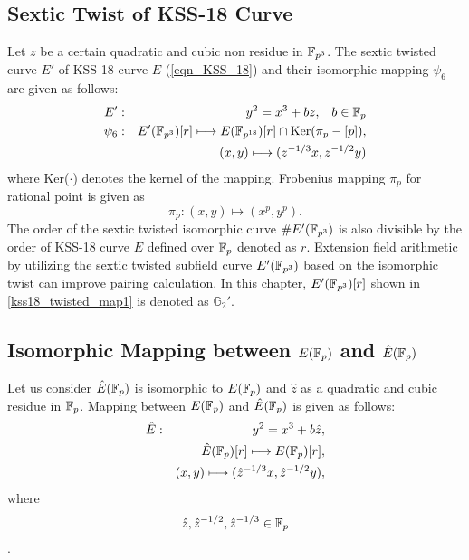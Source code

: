 \subsection{Sextic Twist of KSS-18 Curve }
\label{sec:ch:icisc:sextictwist_KSS18}
Let $z$ be a certain quadratic and cubic non residue in  $\mathbb{F}_{p^{3}}$. 
The sextic twisted curve $E'$ of KSS-18 curve $E$ (\eqref{eqn_KSS_18}) and  their isomorphic mapping $\psi_6$ are given as follows:
\begin{eqnarray}
E'&:&y^2=x^3+bz,\;\;\;b\in{\mathbb{F}}_{p}\nonumber\\
\psi_6&:&E'(\mathbb{F}_{p^{3}})[r] \longmapsto E(\mathbb{F}_{p^{18}})[r]\cap {\rm Ker}(\pi_p-[p]),\nonumber\\
&&(x,y)\longmapsto (z^{-1/3}x,z^{-1/2}y)\label{kss18_twisted_map1}
\end{eqnarray}
where Ker($\cdot$) denotes the kernel of the mapping. Frobenius mapping $\pi_p$ for rational point is given as
\begin{equation}
\pi_p : (x,y) \longmapsto (x^p,y^p).
\end{equation}
The order of the sextic twisted isomorphic curve $\#E'(\mathbb{F}_{p^3})$  is also divisible by the order of KSS-18 curve $E$ defined over ${\mathbb{F}}_{p}$ denoted as $r$. Extension field arithmetic by utilizing the sextic twisted subfield curve $E'(\mathbb{F}_{p^{3}})$ based on the isomorphic twist can improve pairing calculation. In this chapter, $E'(\mathbb{F}_{p^{3}})[r]$ shown in \eqref{kss18_twisted_map1} is denoted as $\mathbb{G}_2'$.

\subsection{Isomorphic Mapping  between \texorpdfstring{$E({\mathbb{F}}_{p})$ and $\hat{E}({\mathbb{F}}_{p})$} {}} 
Let us consider $\hat{E}({\mathbb{F}}_{p})$  is isomorphic to $E({\mathbb{F}}_{p})$ and $\hat{z}$ as a quadratic and cubic residue in ${\mathbb{F}}_{p}$. Mapping between $E({\mathbb{F}}_{p})$ and $\hat{E}({\mathbb{F}}_{p})$ is given as follows:
\begin{eqnarray}
\hat{E}&:&y^2=x^3+b\hat{z},\nonumber\\
&&\hat{E}({\mathbb{F}}_{p})[r]\longmapsto E({\mathbb{F}}_{p})[r],\nonumber\\
&&(x,y)\longmapsto (\hat{z}^{-1/3}x,\hat{z}^{-1/2}y),\nonumber
\end{eqnarray}
where $$\hat{z}, \hat{z}^{-1/2},\hat{z}^{-1/3} \in {\mathbb{F}}_{p}$$ \label{isisc16_kss18_isomap}.
